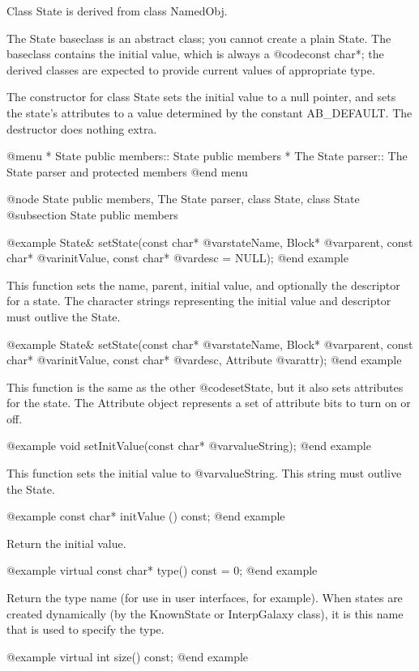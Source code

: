 Class State is derived from class NamedObj.

The State baseclass is an abstract class; you cannot create a plain
State.  The baseclass contains the initial value, which is always
a @code{const char*}; the derived classes are expected to provide
current values of appropriate type.

The constructor for class State sets the initial value to a null
pointer, and sets the state's attributes to a value determined by
the constant AB_DEFAULT.  The destructor does nothing extra.

@menu
* State public members::        State public members
* The State parser::            The State parser and protected members
@end menu

@node State public members, The State parser, class State, class State
@subsection State public members

@example
State& setState(const char* @var{stateName}, Block* @var{parent},
               const char* @var{initValue}, const char* @var{desc} = NULL);
@end example

This function sets the name, parent, initial value, and optionally the
descriptor for a state.  The character strings representing the initial
value and descriptor must outlive the State.

@example
State& setState(const char* @var{stateName}, Block* @var{parent},
               const char* @var{initValue}, const char* @var{desc},
               Attribute @var{attr});
@end example

This function is the same as the other @code{setState}, but it also
sets attributes for the state.  The Attribute object represents a
set of attribute bits to turn on or off.

@example
void setInitValue(const char* @var{valueString});
@end example

This function sets the initial value to @var{valueString}.  This
string must outlive the State.

@example
const char* initValue () const;
@end example

Return the initial value.

@example
virtual const char* type() const = 0;
@end example

Return the type name (for use in user interfaces, for example).
When states are created dynamically (by the KnownState or InterpGalaxy
class), it is this name that is used to specify the type.

@example
virtual int size() const;
@end example

